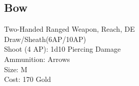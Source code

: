 \subsection{Bow}\label{weapon:bow}
Two-Handed Ranged Weapon,  Reach, DE\\
Draw/Sheath(6AP/10AP)\\
Shoot (4 AP): 1d10 Piercing Damage\\
Ammunition: Arrows\\
Size: M\\
Cost: 170 Gold\\